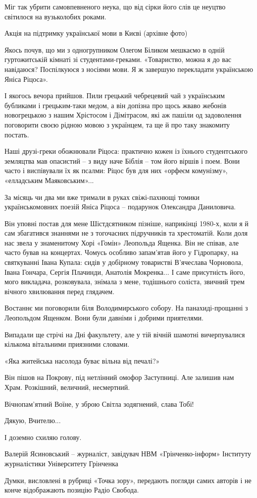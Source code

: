 Міг так убрити самовпевненого неука, що від сірки його слів це неуцтво
світилося на вузьколобих роками.

 Акція на підтримку української мови в Києві (архівне фото)

Якось почув, що ми з одногрупником Олегом Біликом мешкаємо в одній
гуртожитській кімнаті зі студентами-греками. «Товариство, можна я до вас
навідаюся? Поспілкуюся з носіями мови. Я ж завершую перекладати українською
Яніса Ріцоса».

І якогось вечора прийшов. Пили грецький чебрецевий чай з українським бубликами
і грецьким-таки медом, а він допізна про щось жваво жебонів новогрецькою з
нашим Хрістосом і Дімітрасом, які аж пашіли од задоволення поговорити своєю
рідною мовою з українцем, та ще й про таку знакомиту постать.

Наші друзі-греки обожнювали Ріцоса: практично кожен із їхнього студентського
земляцтва мав опасистий – з виду наче Біблія – том його віршів і поем. Вони
часто і виспівували їх як псалми: Ріцос був для них «орфеєм комунізму»,
«елладським Маяковським»...

За місяць чи два ми вже тримали в руках свіжі-пахнющі томики українськомовних
поезій Яніса Ріцоса – подарунок Олександра Даниловича. 

Він уповні постав для мене Шістдсятником пізніше, наприкінці 1980-х, коли я й
сам збагатився знаннями не з тогочасних підручників та хрестоматій. Коли доля
нас звела у знаменитому Хорі «Гомін» Леопольда Ященка. Він не співав, але часто
бував на концертах. Чомусь особливо запам'ятав його у Гідропарку, на
святкуванні Івана Купала: сидів у добірному товаристві В'ячеслава Чорновола,
Івана Гончара, Сергія Плачинди, Анатолія Мокренка... І саме присутність його,
мого викладача, розковувала, знімала з мене, тодішнього соліста, звичний трем
вічного хвилювання перед глядачем. 

Востаннє ми поговорили біля Володимирського собору. На панахиді-прощанні з
Леопольдом Ященком. Вони були давніми і добрими приятелями.

Випадали ще стрічі на Дні факультету, але у тій вічній шамотні вичерпувалися
кількома вітальними приязними словами.

«Яка житейська насолода буває вільна від печалі?»

Він пішов на Покрову, під нетлінний омофор Заступниці. Але залишив нам Храм.
Розкішний, величний, несмертний.

Вічнопам'ятний Воїне, у зброю Світла зодягнений, слава Тобі!

Дякую, Вчителю...

І доземно схиляю голову. 

Валерій Ясиновський – журналіст, завідувач НВМ «Грінченко-інформ» Інституту
журналістики Університету Грінченка

Думки, висловлені в рубриці «Точка зору», передають погляди самих авторів і не
конче відображають позицію Радіо Свобода.
